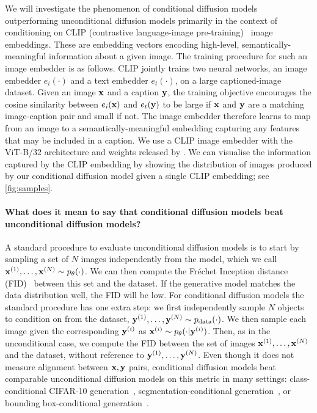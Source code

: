 We will investigate the phenomenon of conditional diffusion models outperforming unconditional diffusion models primarily in the context of conditioning on CLIP (contrastive language-image pre-training)~\citep{radford2021learning} image embeddings. These are embedding vectors encoding high-level, semantically-meaningful information about a given image. The training procedure for such an image embedder is as follows. CLIP jointly trains two neural networks, an image embedder $e_i(\cdot)$ and a text embedder $e_t(\cdot)$, on a large captioned-image dataset. Given an image ${\mathbf{x}}$ and a caption ${\mathbf{y}}$, the training objective encourages the cosine similarity between $e_i({\mathbf{x}})$ and $e_t({\mathbf{y}})$ to be large if ${\mathbf{x}}$ and ${\mathbf{y}}$ are a matching image-caption pair and small if not.
The image embedder therefore learns to map from an image to a semantically-meaningful embedding capturing any features that may be included in a caption. We use a CLIP image embedder with the ViT-B/32 architecture and weights released by \citet{radford2021learning}. We can visualise the information captured by the CLIP embedding by showing the distribution of images produced by our conditional diffusion model given a single CLIP embedding; see \cref{fig:samples}.

\paragraph{What does it mean to say that conditional diffusion models beat unconditional diffusion models?} A standard procedure to evaluate unconditional diffusion models is to start by sampling a set of $N$ images independently from the model, which we call ${\mathbf{x}}^{(1)},\ldots,{\mathbf{x}}^{(N)} \sim p_\theta(\cdot)$. We can then compute the Fr\'echet Inception distance (FID)~\citep{heusel2017gans} between this set and the dataset. If the generative model matches the data distribution well, the FID will be low.
%
For conditional diffusion models the standard procedure has one extra step: we first independently sample $N$ objects to condition on from the dataset, ${{\mathbf{y}}^{(1)},\ldots,{\mathbf{y}}^{(N)} \sim p_{\rm{data}}(\cdot)}$. We then sample each image given the corresponding ${\mathbf{y}}^{(i)}$ as ${{\mathbf{x}}^{(i)} \sim p_\theta(\cdot|{\mathbf{y}}^{(i)})}$. 
%
Then, as in the unconditional case, we compute the FID between the set of images ${\mathbf{x}}^{(1)},\ldots,{\mathbf{x}}^{(N)}$ and the dataset, without reference to ${\mathbf{y}}^{(1)},\ldots,{\mathbf{y}}^{(N)}$. Even though it does not measure alignment between ${\mathbf{x}}, {\mathbf{y}}$ pairs, conditional diffusion models beat comparable unconditional diffusion models on this metric in many settings: class-conditional CIFAR-10 generation~\citep{karras2022elucidating}, segmentation-conditional generation~\citep{hu2022self}, or bounding box-conditional generation~\citep{hu2022self}.

